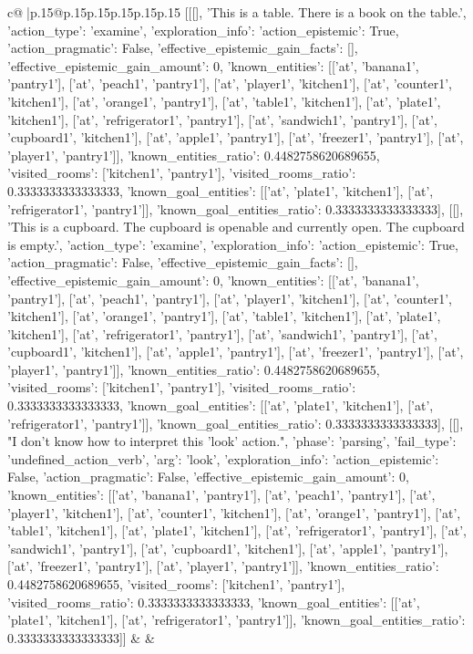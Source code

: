 \documentclass{article}
\begin{document}
{\begin{supertabular}{c@{$\;$}|p{.15\linewidth}@{}p{.15\linewidth}p{.15\linewidth}p{.15\linewidth}p{.15\linewidth}p{.15\linewidth}}
{{{	 [[[], 'This is a table. There is a book on the table.', {'action_type': 'examine', 'exploration_info': {'action_epistemic': True, 'action_pragmatic': False, 'effective_epistemic_gain_facts': [], 'effective_epistemic_gain_amount': 0, 'known_entities': [['at', 'banana1', 'pantry1'], ['at', 'peach1', 'pantry1'], ['at', 'player1', 'kitchen1'], ['at', 'counter1', 'kitchen1'], ['at', 'orange1', 'pantry1'], ['at', 'table1', 'kitchen1'], ['at', 'plate1', 'kitchen1'], ['at', 'refrigerator1', 'pantry1'], ['at', 'sandwich1', 'pantry1'], ['at', 'cupboard1', 'kitchen1'], ['at', 'apple1', 'pantry1'], ['at', 'freezer1', 'pantry1'], ['at', 'player1', 'pantry1']], 'known_entities_ratio': 0.4482758620689655, 'visited_rooms': ['kitchen1', 'pantry1'], 'visited_rooms_ratio': 0.3333333333333333, 'known_goal_entities': [['at', 'plate1', 'kitchen1'], ['at', 'refrigerator1', 'pantry1']], 'known_goal_entities_ratio': 0.3333333333333333}}], [[], 'This is a cupboard. The cupboard is openable and currently open. The cupboard is empty.', {'action_type': 'examine', 'exploration_info': {'action_epistemic': True, 'action_pragmatic': False, 'effective_epistemic_gain_facts': [], 'effective_epistemic_gain_amount': 0, 'known_entities': [['at', 'banana1', 'pantry1'], ['at', 'peach1', 'pantry1'], ['at', 'player1', 'kitchen1'], ['at', 'counter1', 'kitchen1'], ['at', 'orange1', 'pantry1'], ['at', 'table1', 'kitchen1'], ['at', 'plate1', 'kitchen1'], ['at', 'refrigerator1', 'pantry1'], ['at', 'sandwich1', 'pantry1'], ['at', 'cupboard1', 'kitchen1'], ['at', 'apple1', 'pantry1'], ['at', 'freezer1', 'pantry1'], ['at', 'player1', 'pantry1']], 'known_entities_ratio': 0.4482758620689655, 'visited_rooms': ['kitchen1', 'pantry1'], 'visited_rooms_ratio': 0.3333333333333333, 'known_goal_entities': [['at', 'plate1', 'kitchen1'], ['at', 'refrigerator1', 'pantry1']], 'known_goal_entities_ratio': 0.3333333333333333}}], [[], "I don't know how to interpret this 'look' action.", {'phase': 'parsing', 'fail_type': 'undefined_action_verb', 'arg': 'look', 'exploration_info': {'action_epistemic': False, 'action_pragmatic': False, 'effective_epistemic_gain_amount': 0, 'known_entities': [['at', 'banana1', 'pantry1'], ['at', 'peach1', 'pantry1'], ['at', 'player1', 'kitchen1'], ['at', 'counter1', 'kitchen1'], ['at', 'orange1', 'pantry1'], ['at', 'table1', 'kitchen1'], ['at', 'plate1', 'kitchen1'], ['at', 'refrigerator1', 'pantry1'], ['at', 'sandwich1', 'pantry1'], ['at', 'cupboard1', 'kitchen1'], ['at', 'apple1', 'pantry1'], ['at', 'freezer1', 'pantry1'], ['at', 'player1', 'pantry1']], 'known_entities_ratio': 0.4482758620689655, 'visited_rooms': ['kitchen1', 'pantry1'], 'visited_rooms_ratio': 0.3333333333333333, 'known_goal_entities': [['at', 'plate1', 'kitchen1'], ['at', 'refrigerator1', 'pantry1']], 'known_goal_entities_ratio': 0.3333333333333333}}]] 
	  } 
	   } 
	   } 
	 & & \\ 
 


\end{supertabular}}
\end{document}
